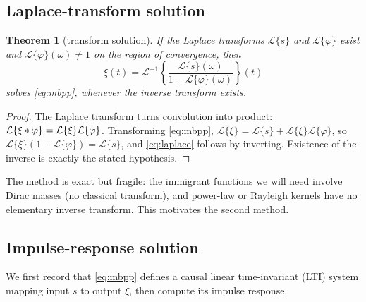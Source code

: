 \documentclass[11pt]{article}
\theoremstyle{plain}
\newtheorem{theorem}{Theorem}[section]
\theoremstyle{definition}
\theoremstyle{remark}
\newcommand{\Lap}{\mathcal{L}}
\begin{document}
\subsection{Laplace-transform solution}

\begin{theorem}[transform solution]
\label{thm:laplace}
If the Laplace transforms $\Lap\{s\}$ and $\Lap\{\varphi\}$ exist and
$\Lap\{\varphi\}(\omega)\ne1$ on the region of convergence, then
\begin{equation}
\xi(t)=\Lap^{-1}\!\left\{\frac{\Lap\{s\}(\omega)}{1-\Lap\{\varphi\}(\omega)}\right\}(t)
\label{eq:laplace}
\end{equation}
solves \eqref{eq:mbpp}, whenever the inverse transform exists.
\end{theorem}
\begin{proof}
The Laplace transform turns convolution into product: $\Lap\{\xi\conv\varphi\}
=\Lap\{\xi\}\Lap\{\varphi\}$. Transforming \eqref{eq:mbpp},
$\Lap\{\xi\}=\Lap\{s\}+\Lap\{\xi\}\Lap\{\varphi\}$, so
$\Lap\{\xi\}(1-\Lap\{\varphi\})=\Lap\{s\}$, and \eqref{eq:laplace} follows by
inverting. Existence of the inverse is exactly the stated hypothesis.
\end{proof}

The method is exact but fragile: the immigrant functions we will need involve
Dirac masses (no classical transform), and power-law or Rayleigh kernels have no
elementary inverse transform. This motivates the second method.

\subsection{Impulse-response solution}

We first record that \eqref{eq:mbpp} defines a causal linear time-invariant (LTI)
system mapping input $s$ to output $\xi$, then compute its impulse response.
\end{document}
